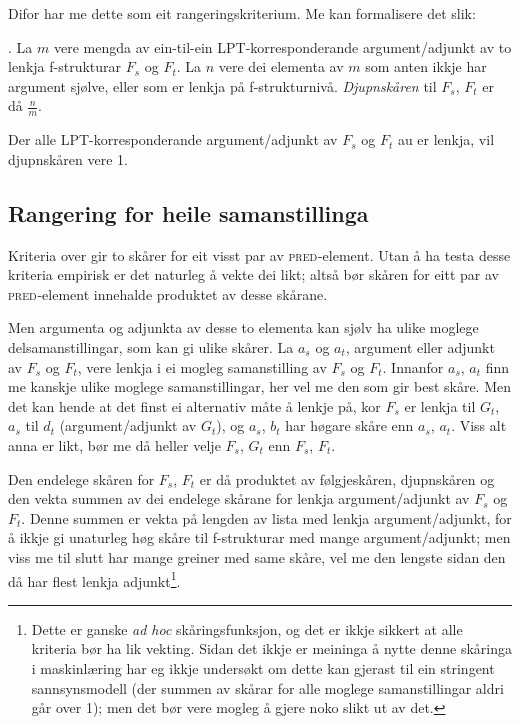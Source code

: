 \documentclass[11pt,a4paper,oneside,draft]{report}
\newcommand{\F}[2]{\textsc{#1}\ensuremath{_{#2}}}
\newcommand{\PRED}{\F{pred}{}}
\begin{document}
Difor har me dette som eit rangeringskriterium. Me kan formalisere det
slik:

\ex. \label{krav:sub-f-rate} La $m$ vere mengda av ein-til-ein
     LPT-korresponderande argument/adjunkt av to lenkja f-strukturar
     $F_s$ og $F_t$. La $n$ vere dei elementa av $m$ som anten ikkje
     har argument sjølve, eller som er lenkja på
     f-strukturnivå. \emph{Djupnskåren} til $F_s$, $F_t$ er då
     $\frac{n}{m}$.

Der alle LPT-korresponderande argument/adjunkt av $F_s$ og $F_t$ au er
lenkja, vil djupnskåren vere 1.

\subsection{Rangering for heile samanstillinga}
\label{sec-3.8.3}

Kriteria over gir to skårer for eit visst par av \PRED{}-element. Utan å
ha testa desse kriteria empirisk er det naturleg å vekte dei likt;
altså bør skåren for eitt par av \PRED{}-element innehalde produktet av
desse skårane.

Men argumenta og adjunkta av desse to elementa kan sjølv ha ulike
moglege delsamanstillingar, som kan gi ulike skårer. La $a_s$ og
$a_t$, argument eller adjunkt av $F_s$ og $F_t$, vere lenkja i ei
mogleg samanstilling av $F_s$ og $F_t$. Innanfor $a_s$, $a_t$ finn me
kanskje ulike moglege samanstillingar, her vel me den som gir best
skåre. Men det kan hende at det finst ei alternativ måte å lenkje på,
kor $F_s$ er lenkja til $G_t$, $a_s$ til $d_t$ (argument/adjunkt av
$G_t$), og $a_s$, $b_t$ har høgare skåre enn $a_s$, $a_t$. Viss alt
anna er likt, bør me då heller velje $F_s$, $G_t$ enn $F_s$, $F_t$.

Den endelege skåren for $F_s$, $F_t$ er då produktet av følgjeskåren,
djupnskåren og den vekta summen av dei endelege skårane for lenkja
argument/adjunkt av $F_s$ og $F_t$. Denne summen er vekta på lengden
av lista med lenkja argument/adjunkt, for å ikkje gi unaturleg høg
skåre til f-strukturar med mange argument/adjunkt; men viss me til
slutt har mange greiner med same skåre, vel me den lengste sidan den
då har flest lenkja adjunkt\footnote{Dette er ganske \emph{ad hoc} skåringsfunksjon, og det er ikkje
        sikkert at alle kriteria bør ha lik vekting.  Sidan det ikkje
        er meininga å nytte denne skåringa i maskinlæring har eg ikkje
        undersøkt om dette kan gjerast til ein stringent
        sannsynsmodell (der summen av skårar for alle moglege
        samanstillingar aldri går over 1); men det bør vere mogleg å
        gjere noko slikt ut av det. }.
\end{document}
